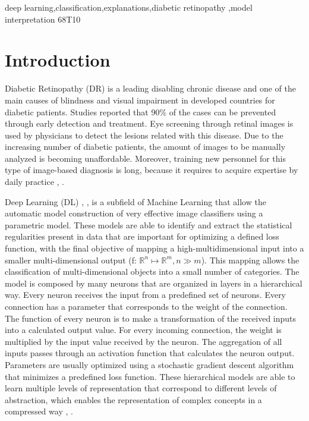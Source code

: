 \documentclass[review]{elsarticle}
\theoremstyle{definition} %
\theoremstyle{remark}
\begin{document}
\begin{frontmatter}
\begin{keyword}
deep learning\sep classification\sep explanations\sep diabetic retinopathy \sep model interpretation
\MSC[2010] 68T10
\end{keyword}

\end{frontmatter}


\section{Introduction}

Diabetic Retinopathy (DR) is a leading disabling chronic disease  and  one of the main causes of blindness and visual impairment in developed countries for diabetic patients. Studies reported that 90\% of the cases can be prevented through early detection and treatment. Eye screening through retinal images is used by physicians to detect the lesions related with this disease. Due to the increasing number of diabetic patients, the amount of images to be manually analyzed is becoming unaffordable. Moreover, training new personnel for this type of image-based diagnosis is long, because it requires to acquire expertise by daily practice \cite{pedro2010prevalence}, \cite{romero2011managing}.

Deep Learning (DL) \cite{nature-deep-learning}, \cite{Schmidhuber-nn}, is a subfield of Machine Learning that allow the automatic model construction of very effective image classifiers using a parametric model. These models are able to identify and extract the statistical regularities present in data that are important for optimizing a defined loss function, with the final objective of mapping a high-multidimensional input into a smaller multi-dimensional output (f: $\mathbb{R}^{n} \mapsto \mathbb{R}^{m}, n \gg m$). This mapping allows the classification of multi-dimensional objects into a small number of categories. The model is composed by many neurons that are organized in layers in a hierarchical way. Every neuron receives the input from a predefined set of neurons. Every connection has a parameter that corresponds to the weight of the connection. The function of every neuron is to make a transformation of the received inputs into a calculated output value. For every incoming connection, the weight is multiplied by the input value received by the neuron. The aggregation of all inputs passes through an activation function that calculates the neuron output. Parameters are usually optimized using a stochastic gradient descent algorithm that minimizes a predefined loss function. These hierarchical models are able to learn multiple levels of representation that correspond to different levels of abstraction, which enables the representation of complex concepts in a compressed way \cite{Bengio:2013:RLR:2498740.2498889}, \cite{bengio-2009}.
\end{document}
